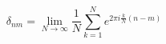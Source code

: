 \begin{equation}
\delta _{nm}=\lim _{N\to \infty }{\frac {1}{N}}\sum _{k=1}^{N}e^{2\pi i{\frac {k}{N}}(n-m)}
\end{equation}